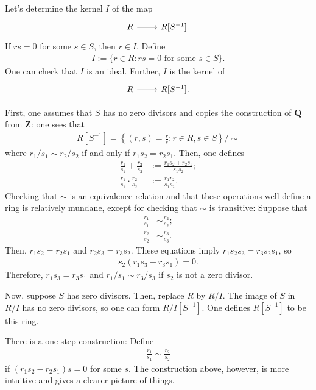 \documentclass [11 pt, oneside] {article}
\begin{document}
Let's determine the kernel $I$ of the map 
\[
\begin{tikzcd}
R\ar[r]& R[S^{-1}].
\end{tikzcd}
\]
If $rs=0$ for some $s\in S$, then $r\in I$. Define
\begin{align*}
	I := \{r\in R: rs=0\textrm{ for some $s\in S$}\}.
\end{align*}
One can check that $I$ is an ideal. Further, $I$ is the kernel of 
\[
\begin{tikzcd}
R\ar[r]& R[S^{-1}].
\end{tikzcd}
\]


First, one assumes that $S$ has no zero divisors and copies the construction of $\mathbf{Q}$ from $\mathbf{Z}$: one sees that
\begin{align*}
	R[S^{-1}] = \left\{ (r,s) =  \frac{r}{s} : r\in R, s\in S \right\}/\sim 
\end{align*}
where $r_1/s_1 \sim r_2/s_2$ if and only if $r_1s_2 = r_2s_1$. Then, one defines 
\begin{align*}
	\frac{r_1}{s_1}+\frac{r_2}{s_2} &:= \frac{r_1s_2+r_2s_1}{s_1s_2};\\
	\frac{r_1}{s_1}\cdot\frac{r_2}{s_2}&:= \frac{r_1r_2}{s_1s_2}.
\end{align*}
Checking that $\sim$ is an equivalence relation and that these operations well-define a ring is relatively mundane, except for checking that $\sim$ is transitive: Suppose that
\begin{align*}
	\frac{r_1}{s_1}&\sim \frac{r_2}{s_2};\\
	\frac{r_2}{s_2}&\sim \frac{r_3}{s_3}.
\end{align*}
Then, $r_1s_2=r_2s_1$ and $r_2s_3=r_3s_2$. These equations imply $r_1s_2s_3=r_3s_2s_1$, so
\begin{align*}
	s_2(r_1s_3-r_3s_1)=0.
\end{align*}
Therefore, $r_1s_3=r_3s_1$ and $r_1/s_1\sim r_3/s_3$ if $s_2$ is not a zero divisor.

Now, suppose $S$ has zero divisors. Then, replace $R$ by $R/I$. The image of $S$ in $R/I$ has no zero divisors, so one can form $R/I[S^{-1}]$. One defines $R[S^{-1}]$ to be this ring. 

There is a one-step construction: Define
\begin{align*}
\frac{r_1}{s_1}\sim \frac{r_2}{s_2}	
\end{align*}
if $(r_1s_2-r_2s_1)s=0$ for some $s$. The construction above, however, is more intuitive and gives a clearer picture of things.
\end{document}

